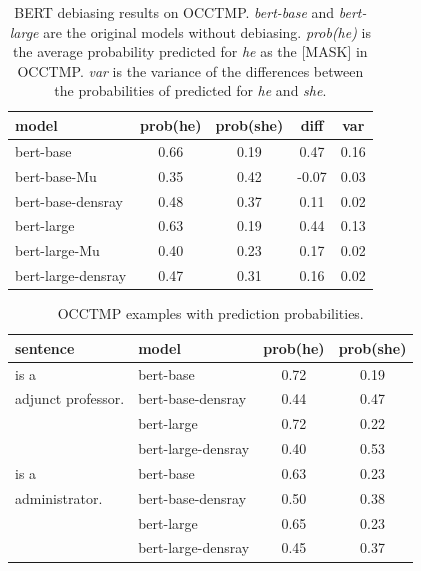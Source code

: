 \begin{table}[ht]
\centering
\footnotesize
\begin{tabular}{lcccc}
\hline
model & prob(he) & prob(she) & diff & var\\
\hline
bert-base & 0.66 & 0.19 & 0.47 &0.16\\
bert-base-Mu & 0.35 & 0.42 & -0.07  &0.03\\
bert-base-densray & 0.48 & 0.37 & {0.11} &0.02\\
\hline
bert-large  & 0.63 & 0.19 & 0.44  &0.13\\
bert-large-Mu & 0.40 & 0.23 & 0.17  &0.02\\
bert-large-densray  & 0.47 & 0.31 & {0.16} &0.02 \\
\hline
\end{tabular}
\caption{ BERT debiasing results on
  OCCTMP. \textit{bert-base} and \textit{bert-large} are the
  original models without debiasing. \textit{prob(he)} is
  the average probability  predicted for \textit{he} as
  the [MASK] in OCCTMP. \textit{var} is the variance of the
  differences between the probabilities of  predicted
  for \textit{he} and \textit{she}. }
\end{table}
\begin{table}[ht]
\centering
\footnotesize
\begin{tabular}{llcc}
\hline
sentence & model & prob(he) & prob(she)\\
\hline
[MASK] is a & 
\scriptsize bert-base 
& 0.72 & 0.19\\
adjunct professor. & 
\scriptsize bert-base-densray 
& 0.44 & 0.47\\
&\scriptsize bert-large
& 0.72 & 0.22\\
&\scriptsize bert-large-densray& 0.40 & 0.53\\
\hline
[MASK] is a 
&\scriptsize bert-base 
& 0.63 & 0.23\\
administrator.  
&\scriptsize bert-base-densray 
& 0.50 & 0.38\\
&\scriptsize bert-large & 0.65 & 0.23\\
&\scriptsize bert-large-densray & 0.45 & 0.37\\
\hline
\end{tabular}
\caption{
OCCTMP examples with prediction probabilities.}
\end{table}



